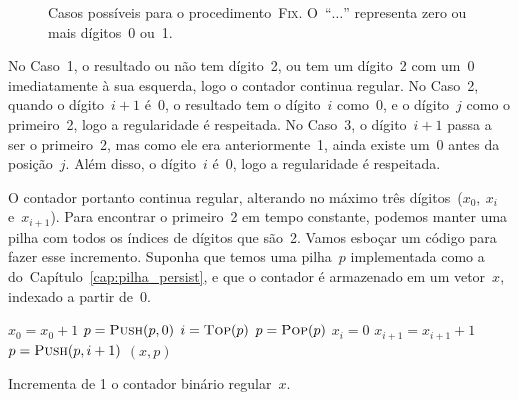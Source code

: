 \documentclass[../../main.tex]{subfiles}
\begin{document}
\begin{figure}[h]

\caption{Casos possíveis para o procedimento~\textsc{Fix}. O~``$\ldots$'' representa zero ou mais dígitos~0 ou~1.} \label{fig:cont_ex}
\end{figure}

No Caso~1, o resultado ou não tem dígito~2, ou tem um dígito~2 com um~0 imediatamente à sua esquerda, logo o contador continua regular. No Caso~2, quando o dígito~$i + 1$ é~0, o resultado tem o dígito~$i$ como~0, e o dígito~$j$ como o primeiro~2, logo a regularidade é respeitada. No Caso~3, o dígito~$i+1$ passa a ser o primeiro~2, mas como ele era anteriormente~1, ainda existe um~0 antes da posição~$j$. Além disso, o dígito~$i$ é~0, logo a regularidade é respeitada.

O contador portanto continua regular, alterando no máximo três dígitos~($x_0,\ x_i$ e~$x_{i+1}$). Para encontrar o primeiro~2 em tempo constante, podemos manter uma pilha com todos os índices de dígitos que são~2. Vamos esboçar um código para fazer esse incremento. Suponha que temos uma pilha~$p$ implementada como a do~Capítulo~\ref{cap:pilha_persist}, e que o contador é armazenado em um vetor~$x$, indexado a partir de~0.


\begin{algorithm}
\begin{algorithmic}[1]

    \State $x_0 = x_0 + 1$
        \State $p = \Call{Push}{p, 0}$
    \EndIf
     
        \State $i = \Call{Top}{p}$
        \State $p = \Call{Pop}{p}$
        \State $x_i = 0$
        \State $x_{i+1} = x_{i+1} + 1$
            \State $p = \Call{Push}{p, i + 1}$
        \EndIf
    \EndIf
    \State \Return $(x, p)$
\EndFunction

\end{algorithmic}
\caption{Incrementa de 1 o contador binário regular~$x$. \label{lst:cnt_reg}}
\end{algorithm}
\end{document}
